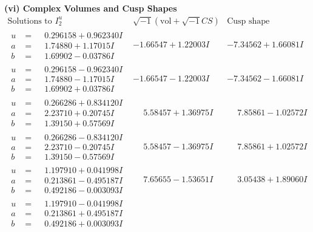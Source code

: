 \documentclass[1p]{elsarticle_modified}
\theoremstyle{definition}
\newcommand{\I}{\sqrt{-1}}
\begin{document}
\newpage\flushleft \textbf{(vi) Complex Volumes and Cusp Shapes}
$$\begin{array}{c|c|c}  
\text{Solutions to }I^u_{2}& \I (\text{vol} + \sqrt{-1}CS) & \text{Cusp shape}\\
 \hline 
\begin{aligned}
u &= \phantom{-}0.296158 + 0.962340 I \\
a &= \phantom{-}1.74880 + 1.17015 I \\
b &= \phantom{-}1.69902 - 0.03786 I\end{aligned}
 & -1.66547 + 1.22003 I & -7.34562 + 1.66081 I \\ \hline\begin{aligned}
u &= \phantom{-}0.296158 - 0.962340 I \\
a &= \phantom{-}1.74880 - 1.17015 I \\
b &= \phantom{-}1.69902 + 0.03786 I\end{aligned}
 & -1.66547 - 1.22003 I & -7.34562 - 1.66081 I \\ \hline\begin{aligned}
u &= \phantom{-}0.266286 + 0.834120 I \\
a &= \phantom{-}2.23710 + 0.20745 I \\
b &= \phantom{-}1.39150 + 0.57569 I\end{aligned}
 & \phantom{-}5.58457 + 1.36975 I & \phantom{-}7.85861 - 1.02572 I \\ \hline\begin{aligned}
u &= \phantom{-}0.266286 - 0.834120 I \\
a &= \phantom{-}2.23710 - 0.20745 I \\
b &= \phantom{-}1.39150 - 0.57569 I\end{aligned}
 & \phantom{-}5.58457 - 1.36975 I & \phantom{-}7.85861 + 1.02572 I \\ \hline\begin{aligned}
u &= \phantom{-}1.197910 + 0.041998 I \\
a &= \phantom{-}0.213861 - 0.495187 I \\
b &= \phantom{-}0.492186 - 0.003093 I\end{aligned}
 & \phantom{-}7.65655 - 1.53651 I & \phantom{-}3.05438 + 1.89060 I \\ \hline\begin{aligned}
u &= \phantom{-}1.197910 - 0.041998 I \\
a &= \phantom{-}0.213861 + 0.495187 I \\
b &= \phantom{-}0.492186 + 0.003093 I\end{aligned}

\end{array}$$
\end{document}
